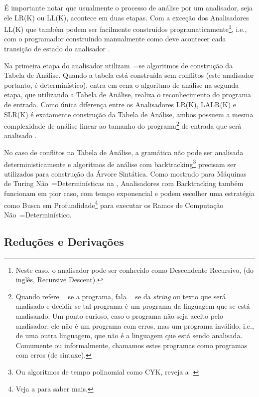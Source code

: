 É importante notar que usualmente o processo de análise por um analisador,
seja ele LR(K) ou
LL(K),
acontece em duas etapas.
Com a exceção dos Analisadores LL(K) que também podem ser facilmente construídos programaticamente\footnote{
Neste caso,
o analisador pode ser conhecido como Descendente Recursivo,
(do inglês,
Recursive Descent).
},
i.e.,
com o programador construindo manualmente como deve acontecer cada transição de estado do analisador \cite{ahoCompilerDragonBook}.

Na primeira etapa do analisador utilizam~=se algoritmos de construção da Tabela de Análise.
Quando a tabela está construída sem conflitos (este analisador portanto,
é determinístico),
entra em cena o algoritmo de análise na segunda etapa,
que utilizando a Tabela de Análise,
realiza o reconhecimento do programa de entrada.
Como única diferença entre os Analisadores LR(K),
LALR(K) e
SLR(K) é exatamente construção da Tabela de Análise,
ambos possuem a mesma complexidade de análise linear ao tamanho do programa\footnote{
Quando refere~=se a programa,
fala~=se da \textit{string} ou
texto que será analisado e
decidir se tal programa é um programa da linguagem que se está analisando.
Um ponto curioso,
caso o programa não seja aceito pelo analisador,
ele não é um programa com erros,
mas um programa inválido,
i.e.,
de uma outra linguagem,
que não é a linguagem que está sendo analisada.
Comumente ou
informalmente,
chamamos estes programas como programas com erros (de sintaxe).
}
de entrada que será analisado \cite{knuthLrParser1965,linearLL1AndLR1Grammars,generalContextFreeParsingAlgorithm}.

No caso de conflitos na Tabela de Análise,
a gramática não pode ser analisada deterministicamente e
algoritmos de análise com backtracking\footnote{
Ou algoritmos de tempo polinomial como CYK,
reveja a .
}
precisam ser utilizados para construção da Árvore Sintática.
Como mostrado para Máquinas de Turing Não~=Determinísticas na ,
Analisadores com Backtracking também funcionam em pior caso,
com tempo exponencial e
podem escolher uma estratégia como Busca em Profundidade\footnote{
Veja a  para saber mais.
} para executar os Ramos de Computação Não~=Determinístico.


\subsection{Reduções e Derivações}
\label{reducoesEderivacoes}

